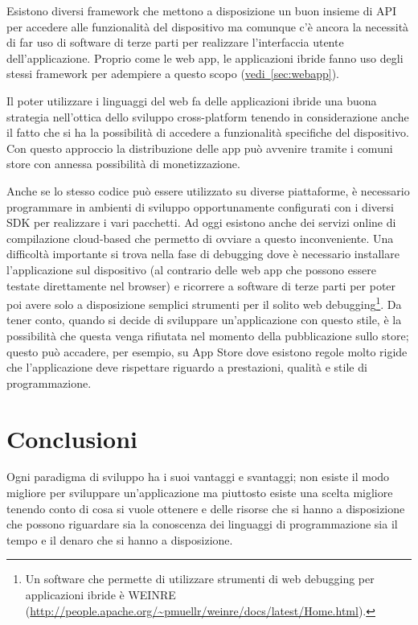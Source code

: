 		Esistono diversi framework che mettono a disposizione un buon insieme di 
		API per accedere alle funzionalità del dispositivo ma comunque c'è 
		ancora la necessità di far uso di software di terze parti per realizzare 
		l'interfaccia utente dell'applicazione. Proprio come le web app, le 
		applicazioni ibride fanno uso degli stessi framework per adempiere a 
		questo scopo (\hyperref[sec:webapp]{vedi~\ref{sec:webapp}}).
		
		Il poter utilizzare i linguaggi del web fa delle applicazioni ibride una 
		buona strategia nell'ottica dello sviluppo cross-platform tenendo in 
		considerazione anche il fatto che si ha la possibilità di accedere a 
		funzionalità specifiche del dispositivo. Con questo approccio la 
		distribuzione delle app può avvenire tramite i comuni store con 
		annessa possibilità di monetizzazione.
		
		Anche se lo stesso codice può essere utilizzato su diverse piattaforme, 
		è necessario programmare in ambienti di sviluppo opportunamente 
		configurati con i diversi SDK per realizzare i vari pacchetti. Ad oggi 
		esistono anche dei servizi online di compilazione cloud-based che 
		permetto di ovviare a questo inconveniente. Una difficoltà importante si 
		trova nella fase di debugging dove è necessario installare 
		l'applicazione sul dispositivo (al contrario delle web app che possono 
		essere testate direttamente nel browser) e ricorrere a software di terze 
		parti per poter poi avere solo a disposizione semplici strumenti per il 
		solito web debugging\footnote{Un software che permette di utilizzare 
		strumenti di web debugging per applicazioni ibride è WEINRE 
		(\url{http://people.apache.org/~pmuellr/weinre/docs/latest/Home.html}). 
		}. Da tener conto, quando si decide di sviluppare un'applicazione con 
		questo stile, è la possibilità che questa venga rifiutata nel momento 
		della pubblicazione sullo store; questo può accadere, per esempio, su 
		App Store dove esistono regole molto rigide che l'applicazione deve 
		rispettare riguardo a prestazioni, qualità e stile di programmazione.
		
	\section{Conclusioni}
		Ogni paradigma di sviluppo ha i suoi vantaggi e svantaggi; non esiste il 
		modo migliore per sviluppare un'applicazione ma piuttosto esiste una 
		scelta migliore tenendo conto di cosa si vuole ottenere e delle risorse 
		che si hanno a disposizione che possono riguardare sia la conoscenza dei
		linguaggi di programmazione sia il tempo e il denaro che si hanno a
		disposizione.
		
